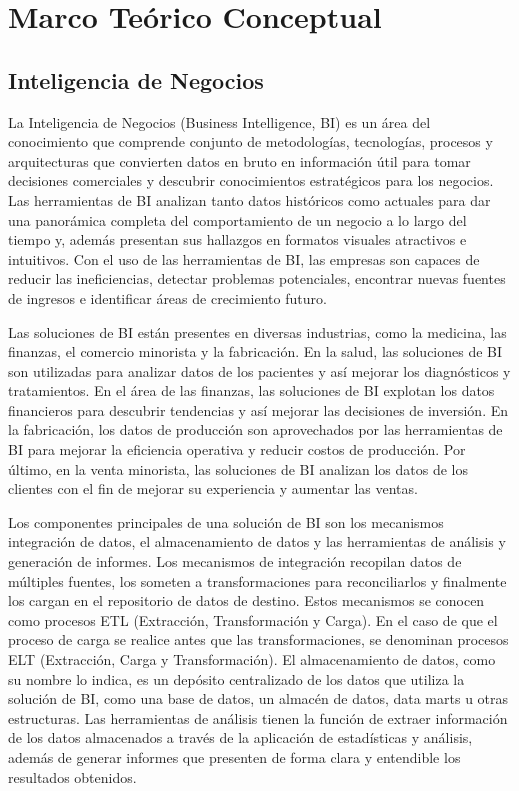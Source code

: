 \chapter{Marco Te\'orico Conceptual}\label{chapter:teoricframe}

\section{Inteligencia de Negocios}\label{section:bi}

La Inteligencia de Negocios (Business Intelligence, BI) es un \'area del conocimiento que comprende conjunto de metodologías, 
tecnologías, procesos y arquitecturas que convierten datos 
en bruto en información útil para tomar decisiones comerciales y descubrir conocimientos estratégicos para los negocios. 
Las herramientas de BI analizan tanto datos históricos como actuales para dar una panor\'amica completa del comportamiento 
de un negocio a lo largo del tiempo y, adem\'as presentan sus hallazgos en formatos visuales atractivos e intuitivos. 
Con el uso de las herramientas de BI, las empresas son capaces de reducir las ineficiencias, detectar problemas potenciales, 
encontrar nuevas fuentes de ingresos e identificar áreas de crecimiento futuro.

Las soluciones de BI est\'an presentes en diversas industrias, como la medicina, las finanzas, el comercio minorista y la 
fabricación. En la salud, las soluciones de BI son utilizadas para analizar datos de los pacientes y as\'i mejorar los
diagn\'osticos y tratamientos. En el \'area de las finanzas, las soluciones de BI explotan los datos financieros para 
descubrir tendencias y as\'i mejorar las decisiones de inversi\'on. En la fabricación, los datos de producción son aprovechados 
por las herramientas de BI para mejorar la eficiencia operativa y reducir costos de producción. Por \'ultimo, en la 
venta minorista, las soluciones de BI analizan los datos de los clientes con el fin de mejorar su experiencia y 
aumentar las ventas.

Los componentes principales de una solución de BI son los mecanismos integración de datos, el almacenamiento de datos y 
las herramientas de análisis y generaci\'on de informes\cite{lloyd2011identifying}. Los mecanismos de integración recopilan datos de múltiples fuentes, 
los someten a transformaciones para reconciliarlos y finalmente los cargan en el repositorio de datos de destino. Estos mecanismos se 
conocen como procesos ETL (Extracción, Transformación y Carga). En el caso de que el proceso de carga se realice antes que las transformaciones, 
se denominan procesos ELT (Extracción, Carga y Transformación). 
El almacenamiento de datos, como su nombre lo indica, es un depósito centralizado de los datos que utiliza la solución
de BI, como una base de datos, un almac\'en de datos, data marts u otras estructuras. Las herramientas de análisis tienen la función de extraer 
información de los datos almacenados a través de la aplicación de estadísticas y análisis, adem\'as de generar 
informes que presenten de forma clara y entendible los resultados obtenidos.

